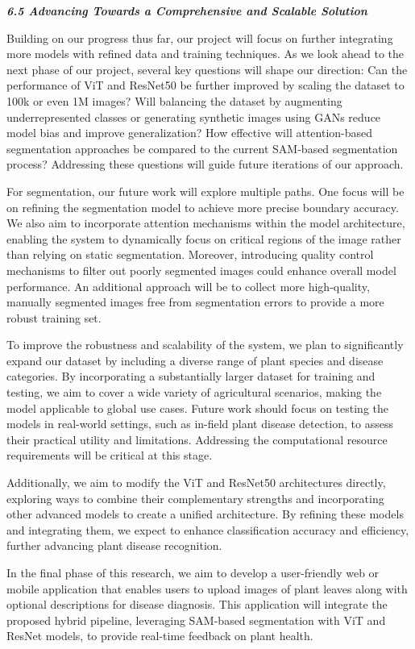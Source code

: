 \documentclass{article}
\begin{document}
\textbf{\textit{6.5 Advancing Towards a Comprehensive and Scalable Solution}}

Building on our progress thus far, our project will focus on further integrating more models with refined data and training techniques. As we look ahead to the next phase of our project, several key questions will shape our direction: Can the performance of ViT and ResNet50 be further improved by scaling the dataset to 100k or even 1M images? Will balancing the dataset by augmenting underrepresented classes or generating synthetic images using GANs reduce model bias and improve generalization? How effective will attention-based segmentation approaches be compared to the current SAM-based segmentation process? Addressing these questions will guide future iterations of our approach.

For segmentation, our future work will explore multiple paths. One focus will be on refining the segmentation model to achieve more precise boundary accuracy. We also aim to incorporate attention mechanisms within the model architecture, enabling the system to dynamically focus on critical regions of the image rather than relying on static segmentation. Moreover, introducing quality control mechanisms to filter out poorly segmented images could enhance overall model performance. An additional approach will be to collect more high-quality, manually segmented images free from segmentation errors to provide a more robust training set.

To improve the robustness and scalability of the system, we plan to significantly expand our dataset by including a diverse range of plant species and disease categories. By incorporating a substantially larger dataset for training and testing, we aim to cover a wide variety of agricultural scenarios, making the model applicable to global use cases. Future work should focus on testing the models in real-world settings, such as in-field plant disease detection, to assess their practical utility and limitations. Addressing the computational resource requirements will be critical at this stage.

Additionally, we aim to modify the ViT and ResNet50 architectures directly, exploring ways to combine their complementary strengths and incorporating other advanced models to create a unified architecture. By refining these models and integrating them, we expect to enhance classification accuracy and efficiency, further advancing plant disease recognition.

In the final phase of this research, we aim to develop a user-friendly web or mobile application that enables users to upload images of plant leaves along with optional descriptions for disease diagnosis. This application will integrate the proposed hybrid pipeline, leveraging SAM-based segmentation with ViT and ResNet models, to provide real-time feedback on plant health.
\end{document}
